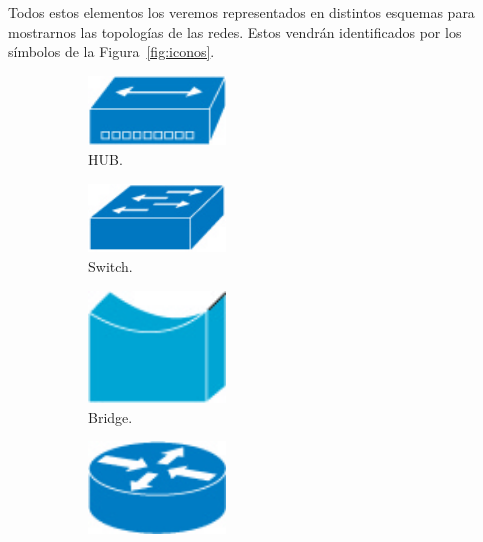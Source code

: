 Todos estos elementos los veremos representados en distintos esquemas para mostrarnos las topologías de las redes.
Estos vendrán identificados por los símbolos de la Figura~\ref{fig:iconos}.
\begin{figure}
    \centering
    \begin{subfigure}{0.25\textwidth}
        \centering
        \includegraphics[width=0.4\textwidth]{./Iconos/hub.jpg}
        \caption{HUB.}
    \end{subfigure}
    \begin{subfigure}{0.25\textwidth}
        \centering
        \includegraphics[width=0.4\textwidth]{./Iconos/switch.jpg}
        \caption{Switch.}
    \end{subfigure}
    \begin{subfigure}{0.25\textwidth}
        \centering
        \includegraphics[width=0.4\textwidth]{./Iconos/bridge.jpg}
        \caption{Bridge.}
    \end{subfigure}
    \begin{subfigure}{0.25\textwidth}
        \centering
        \includegraphics[width=0.4\textwidth]{./Iconos/router.jpg}

\end{subfigure}
\end{figure}
